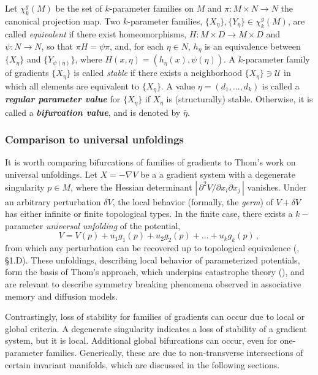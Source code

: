 \documentclass[12pt]{article}
\begin{document}
Let $\chi^g_k(M)$ be the set of $k$-parameter families on $M$ and $\pi: M \times N \rightarrow N$ the canonical projection map. Two $k$-parameter families, $\{ X_{\eta} \},\{ Y_{\eta} \} \in \chi^g_k(M)$, are called \textit{equivalent} if there exist homeomorphisms, $H: M \times D \rightarrow M \times D$ and $\psi: N \rightarrow N$, so that $\pi H = \psi \pi$, and, for each $\eta \in N$, $h_{\eta}$ is an equivalence between $\{ X_{\eta} \}$ and $\{ Y_{\psi(\eta)} \}$, where $H(x,\eta) = \left( h_{\eta}(x), \psi(\eta)\right)$. A $k$-parameter family of gradients $\{ X_{\eta} \}$ is called \textit{stable} if there exists a neighborhood $\{ X_{\eta} \} \ni \mathcal{U}$ in which all elements are equivalent to $\{ X_{\eta} \}$. A value $\eta = (d_1,...,d_k)$ is called a \textbf{\textit{regular parameter value}} for $\{X_{\eta}\}$ if $X_{\eta}$ is (structurally) stable. Otherwise, it is called a \textbf{\textit{bifurcation value}}, and is denoted by $\bar{\eta}$. 



\subsubsection{Comparison to universal unfoldings}
\label{subsubsection:universal-unfoldings}
It is worth comparing bifurcations of families of gradients to Thom's work on universal unfoldings. Let $X = -\nabla V$ be a a gradient system with a degenerate singularity $p \in M$, where the Hessian determinant $| \, \partial^2 V / \partial x_i \partial x_j \, |$ vanishes. Under an arbitrary perturbation $\delta V$, the local behavior (formally, the \textit{germ}) of $V + \delta V$ has either infinite or finite topological types. In the finite case, there exists a $k-$parameter \textit{universal unfolding} of the potential,
\begin{equation*}
    V = V(p) + u_1g_1(p) + u_2g_2(p) + ... + u_kg_k(p) \, ,
\end{equation*}
from which any perturbation can be recovered up to topological equivalence (\cite{thom1969topological}, \S 1.D). These unfoldings, describing local behavior of parameterized potentials, form the basis of Thom’s approach, which underpins catastrophe theory (\cite{zeeman2006classification}), and are relevant to describe symmetry breaking phenomena observed in associative memory and diffusion models.

Contrastingly, loss of stability for families of gradients can occur due to local or global criteria. A degenerate singularity indicates a loss of stability of a gradient system, but it is local. Additional global bifurcations can occur, even for one-parameter families. Generically, these are due to non-transverse intersections of certain invariant manifolds, which are discussed in the following sections.
\end{document}
